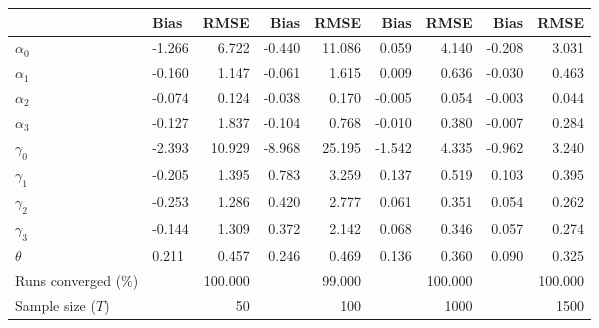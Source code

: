 
\begin{tabular}[t]{llrrrrrrr}
\toprule
  & Bias & RMSE & Bias & RMSE & Bias & RMSE & Bias & RMSE\\
\midrule
$\alpha_{0}$ & -1.266 & 6.722 & -0.440 & 11.086 & 0.059 & 4.140 & -0.208 & 3.031\\
$\alpha_{1}$ & -0.160 & 1.147 & -0.061 & 1.615 & 0.009 & 0.636 & -0.030 & 0.463\\
$\alpha_{2}$ & -0.074 & 0.124 & -0.038 & 0.170 & -0.005 & 0.054 & -0.003 & 0.044\\
$\alpha_{3}$ & -0.127 & 1.837 & -0.104 & 0.768 & -0.010 & 0.380 & -0.007 & 0.284\\
$\gamma_{0}$ & -2.393 & 10.929 & -8.968 & 25.195 & -1.542 & 4.335 & -0.962 & 3.240\\
$\gamma_{1}$ & -0.205 & 1.395 & 0.783 & 3.259 & 0.137 & 0.519 & 0.103 & 0.395\\
$\gamma_{2}$ & -0.253 & 1.286 & 0.420 & 2.777 & 0.061 & 0.351 & 0.054 & 0.262\\
$\gamma_{3}$ & -0.144 & 1.309 & 0.372 & 2.142 & 0.068 & 0.346 & 0.057 & 0.274\\
$\theta$ & 0.211 & 0.457 & 0.246 & 0.469 & 0.136 & 0.360 & 0.090 & 0.325\\
Runs converged (\%) &  & 100.000 &  & 99.000 &  & 100.000 &  & 100.000\\
Sample size ($T$) &  & 50 &  & 100 &  & 1000 &  & 1500\\
\bottomrule
\end{tabular}
